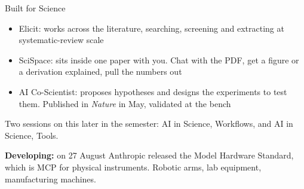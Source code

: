 \documentclass[aspectratio=169]{beamer}
\begin{document}
\begin{frame}{Built for Science}
    \begin{itemize}\setlength{\itemsep}{7pt}
        \item Elicit: works across the literature, searching, screening and extracting at
              systematic-review scale
        \item SciSpace: sits inside one paper with you. Chat with the PDF, get a figure or a
              derivation explained, pull the numbers out
        \item AI Co-Scientist: proposes hypotheses and designs the experiments to test them.
              Published in \textit{Nature} in May, validated at the bench
    \end{itemize}

    \vspace{0.9em}
    \begin{center}
    Two sessions on this later in the semester: AI in Science, Workflows, and AI in Science,
    Tools.
    \end{center}

    \vspace{0.7em}
    {\small \textbf{Developing:} on 27 August Anthropic released the Model Hardware
    Standard, which is MCP for physical instruments. Robotic arms, lab equipment,
    manufacturing machines.}
\end{frame}
\end{document}
